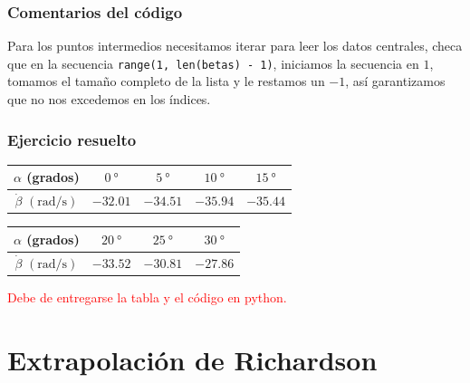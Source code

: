 \begin{frame}[fragile]
\frametitle{Comentarios del código}
Para los puntos intermedios necesitamos iterar para leer los datos centrales, checa que en la secuencia \verb|range(1, len(betas) - 1)|, iniciamos la secuencia en $1$, tomamos el tamaño completo de la lista y le restamos un $-1$, así garantizamos que no nos excedemos en los índices.
\end{frame}
\begin{frame}
\frametitle{Ejercicio resuelto}
\begin{center}
\fontsize{12}{12}\selectfont
\begin{tabular}{c | c | c | c | c | }
$\alpha$ (grados) & $\SI{0}{\degree}$ & $\SI{5}{\degree}$ & $\SI{10}{\degree}$ & $\SI{15}{\degree}$ \\ \hline
$\dot{\beta}$ $(\si{\radian\per\second})$ & $-32.01$ & $-34.51$ & $-35.94$ & $-35.44$ 
\end{tabular}
\end{center}
\begin{center}
\fontsize{12}{12}\selectfont
\begin{tabular}{c | c | c | c }
$\alpha$ (grados) & $\SI{20}{\degree}$ & $\SI{25}{\degree}$ & $\SI{30}{\degree}$  \\ \hline
$\dot{\beta}$ $(\si{\radian\per\second})$ & $-33.52$ & $-30.81$  & $-27.86$ 
\end{tabular}
\end{center}
\textcolor{red}{Debe de entregarse la tabla y el código en python.}
\end{frame}
\section{Extrapolación de Richardson}
